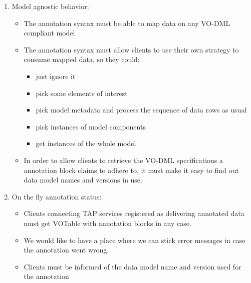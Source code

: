\begin {enumerate}
  \item Model agnostic behavior:
  \begin {itemize}
    \item The annotation syntax must be able to map data on any VO-DML compliant model
    \item The annotation syntax must allow clients to use their own strategy to consume mapped data, so they could:
      \begin {itemize}
        \item just ignore it
        \item pick some elements of interest 
        \item pick model metadata and process the sequence of data rows as usual
        \item pick instances of model components 
        \item get instances of the whole model  
      \end {itemize}
    \item In order to allow clients to retrieve the VO-DML specifications a annotation block claims to adhere to, 
          it must make it easy to find out data model names and versions in use.
  \end {itemize}
  
  \item On the fly annotation status:
      \begin {itemize} 
          \item Clients connecting TAP services registered as delivering annotated data must get VOTable with annotation blocks in any case. 
          \item We would like to have a place where we can stick error messages in case the annotation went wrong.
          \item Clients must be informed of the data model name and version used for the annotation  
       \end {itemize}

\end {enumerate}
